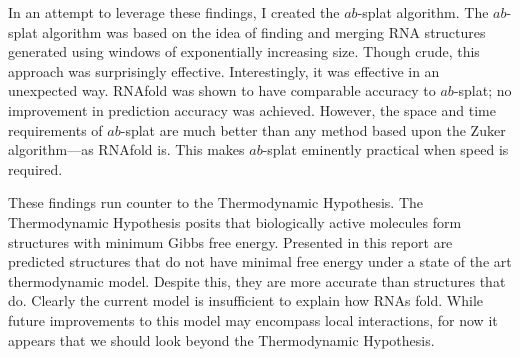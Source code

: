 \documentclass{cshonours}
\begin{document}
In an attempt to leverage these findings, I created the $ab$-splat algorithm. The $ab$-splat algorithm was based on the idea of finding and merging RNA structures generated using windows of exponentially increasing size. Though crude, this approach was surprisingly effective. Interestingly, it was effective in an unexpected way. RNAfold was shown to have comparable accuracy to $ab$-splat; no improvement in prediction accuracy was achieved. However, the space and time requirements of $ab$-splat are much better than any method based upon the Zuker algorithm---as RNAfold is. This makes $ab$-splat eminently practical when speed is required.

These findings run counter to the Thermodynamic Hypothesis. The Thermodynamic Hypothesis posits that biologically active molecules form structures with minimum Gibbs free energy. Presented in this report are predicted structures that do not have minimal free energy under a state of the art thermodynamic model. Despite this, they are more accurate than structures that do. Clearly the current model is insufficient to explain how RNAs fold. While future improvements to this model may encompass local interactions, for now it appears that we should look beyond the Thermodynamic Hypothesis.






\end{document}
